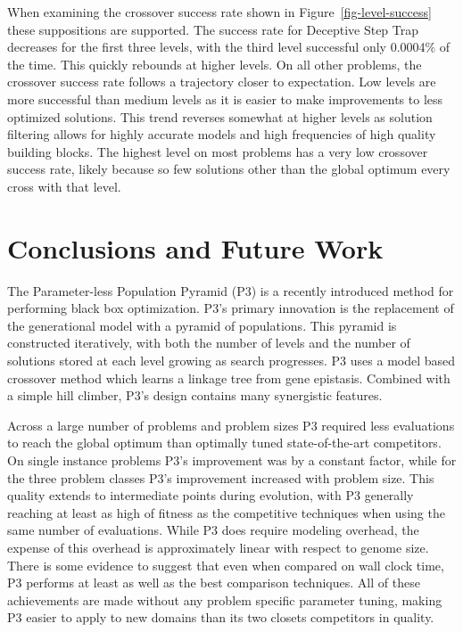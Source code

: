 \documentclass[twoside]{article}
\begin{document}
When examining the crossover success rate shown in Figure~\ref{fig-level-success} these suppositions are
supported. The success rate for Deceptive Step Trap decreases for the first three levels, with the third level
successful only 0.0004\% of the time. This quickly rebounds at higher levels. On all other problems, the
crossover success rate follows a trajectory closer to expectation. Low levels are more successful than medium
levels as it is easier to make improvements to less optimized solutions. This trend reverses somewhat at
higher levels as solution filtering allows for highly accurate models and high frequencies of high quality
building blocks. The highest level on most problems has a very low crossover success rate, likely because
so few solutions other than the global optimum every cross with that level.

\section{Conclusions and Future Work}
The Parameter-less Population Pyramid (P3) is a recently introduced method for performing black box
optimization. P3's primary innovation is the replacement of the generational model with a pyramid of populations.
This pyramid is constructed iteratively, with both the number of levels and the number of solutions stored
at each level growing as search progresses. P3 uses a model based crossover method
which learns a linkage tree from gene epistasis. Combined with a simple hill climber, P3's design contains
many synergistic features.

Across a large number of problems and problem sizes P3 required less evaluations to reach the global optimum
than optimally tuned state-of-the-art competitors. On single instance problems P3's improvement was by a
constant factor, while for the three problem classes P3's improvement increased with problem size. This
quality extends to intermediate points during evolution, with P3 generally reaching at least as high
of fitness as the competitive techniques when using the same number of evaluations. While P3 does require
modeling overhead, the expense of this overhead is approximately linear with respect to genome size. There
is some evidence to suggest that even when compared on wall clock time, P3 performs at least as well as
the best comparison techniques. All of these achievements are made without any problem specific parameter
tuning, making P3 easier to apply to new domains than its two closets competitors in quality.
\end{document}
